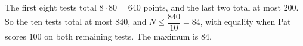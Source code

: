 The first eight tests total $8\cdot80=640$ points, and the last two total at most $200$. So the ten tests total at most $840$, and $N\le\dfrac{840}{10}=84$, with equality when Pat scores $100$ on both remaining tests. The maximum is $\boxed{84}$.
